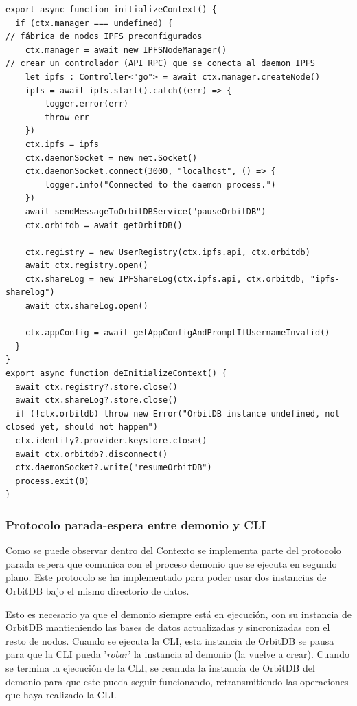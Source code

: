 \begin{verbatim}
export async function initializeContext() {
  if (ctx.manager === undefined) {
// fábrica de nodos IPFS preconfigurados
    ctx.manager = await new IPFSNodeManager()
// crear un controlador (API RPC) que se conecta al daemon IPFS
    let ipfs : Controller<"go"> = await ctx.manager.createNode()
    ipfs = await ipfs.start().catch((err) => {
        logger.error(err)
        throw err
    })
    ctx.ipfs = ipfs
    ctx.daemonSocket = new net.Socket()
    ctx.daemonSocket.connect(3000, "localhost", () => {
        logger.info("Connected to the daemon process.") 
    })
    await sendMessageToOrbitDBService("pauseOrbitDB")
    ctx.orbitdb = await getOrbitDB()
    
    ctx.registry = new UserRegistry(ctx.ipfs.api, ctx.orbitdb)
    await ctx.registry.open()
    ctx.shareLog = new IPFShareLog(ctx.ipfs.api, ctx.orbitdb, "ipfs-sharelog")
    await ctx.shareLog.open()
    
    ctx.appConfig = await getAppConfigAndPromptIfUsernameInvalid()
  }
}
export async function deInitializeContext() {
  await ctx.registry?.store.close()
  await ctx.shareLog?.store.close()
  if (!ctx.orbitdb) throw new Error("OrbitDB instance undefined, not closed yet, should not happen")
  ctx.identity?.provider.keystore.close()
  await ctx.orbitdb?.disconnect()
  ctx.daemonSocket?.write("resumeOrbitDB")
  process.exit(0)
}
\end{verbatim}

\subsubsection{Protocolo parada-espera entre demonio y CLI}

Como se puede observar dentro del Contexto se implementa parte del protocolo parada espera
que comunica con el proceso demonio que se ejecuta en segundo plano. Este protocolo se ha implementado
para poder usar dos instancias de OrbitDB bajo el mismo directorio de datos.

Esto es necesario ya que el demonio siempre está en ejecución, con su instancia de OrbitDB mantieniendo las
bases de datos actualizadas y sincronizadas con el resto de nodos. Cuando se ejecuta la CLI, esta instancia de OrbitDB se pausa para que la CLI pueda
'\textit{robar}' la instancia al demonio (la vuelve a crear). Cuando se termina la ejecución de la CLI, se reanuda la instancia de OrbitDB del demonio para que este pueda seguir funcionando, retransmitiendo las operaciones que haya realizado la CLI.


